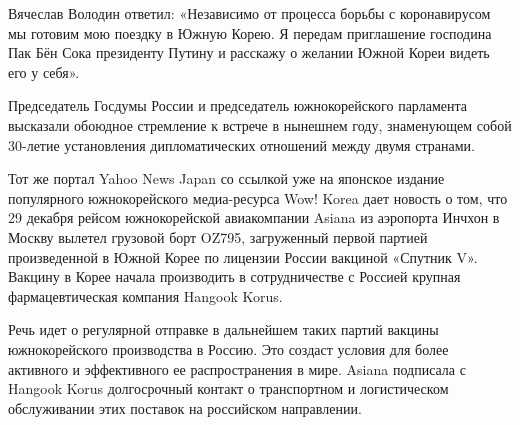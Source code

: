 Вячеслав Володин ответил: «Независимо от процесса борьбы с коронавирусом мы
готовим мою поездку в Южную Корею. Я передам приглашение господина Пак Бён Сока
президенту Путину и расскажу о желании Южной Кореи видеть его у себя».

Председатель Госдумы России и председатель южнокорейского парламента высказали
обоюдное стремление к встрече в нынешнем году, знаменующем собой 30-летие
установления дипломатических отношений между двумя странами.

Тот же портал Yahoo News Japan со ссылкой уже на японское издание популярного
южнокорейского медиа-ресурса Wow! Korea дает новость о том, что 29 декабря
рейсом южнокорейской авиакомпании Asiana из аэропорта Инчхон в Москву вылетел
грузовой борт OZ795, загруженный первой партией произведенной в Южной Корее по
лицензии России вакциной «Спутник V». Вакцину в Корее начала производить в
сотрудничестве с Россией крупная фармацевтическая компания Hangook Korus.

Речь идет о регулярной отправке в дальнейшем таких партий вакцины
южнокорейского производства в Россию. Это создаст условия для более активного и
эффективного ее распространения в мире. Asiana подписала с Hangook Korus
долгосрочный контакт о транспортном и логистическом обслуживании этих поставок
на российском направлении.



